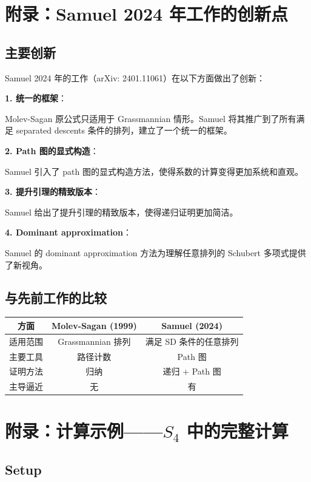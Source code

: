 \section{附录：Samuel 2024 年工作的创新点}
\label{sec:appendix-ch2-samuel-innovation}

\subsection*{主要创新}

Samuel 2024 年的工作（arXiv: 2401.11061）在以下方面做出了创新：

\textbf{1. 统一的框架}：

Molev-Sagan 原公式只适用于 Grassmannian 情形。Samuel 将其推广到了所有满足 separated descents 条件的排列，建立了一个统一的框架。

\textbf{2. Path 图的显式构造}：

Samuel 引入了 path 图的显式构造方法，使得系数的计算变得更加系统和直观。

\textbf{3. 提升引理的精致版本}：

Samuel 给出了提升引理的精致版本，使得递归证明更加简洁。

\textbf{4. Dominant approximation}：

Samuel 的 dominant approximation 方法为理解任意排列的 Schubert 多项式提供了新视角。

\subsection*{与先前工作的比较}

\begin{center}
\begin{tabular}{c|c|c}
方面 & Molev-Sagan (1999) & Samuel (2024) \\ \hline
适用范围 & Grassmannian 排列 & 满足 SD 条件的任意排列 \\
主要工具 & 路径计数 & Path 图 \\
证明方法 & 归纳 & 递归 + Path 图 \\
主导逼近 & 无 & 有
\end{tabular}
\end{center}

\section{附录：计算示例——$S_4$ 中的完整计算}
\label{sec:appendix-ch2-s4-example}

\subsection*{Setup}

